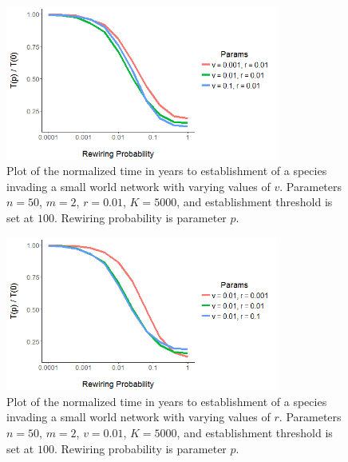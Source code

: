\documentclass[12pt, openany]{book}
\theoremstyle{definition}
\theoremstyle{remark}
\numberwithin{equation}{chapter}
\numberwithin{figure}{chapter}
\begin{document}
\begin{figure}[t!]
\begin{center}
       \includegraphics[width=0.8\textwidth]{smallworldvaryv_norm.png}
       \caption{Plot of the normalized time in years to establishment of a species invading a small world network with varying values of $v$. Parameters $n = 50$, $m = 2$, $r = 0.01$, $K = 5000$, and establishment threshold is set at $100$. Rewiring probability is parameter $p$.\label{smallworld_v}}
\end{center}
\end{figure}
\begin{figure}[t!]
\begin{center}
       \includegraphics[width=0.8\textwidth]{smallworldvaryb_norm.png}
       \caption{Plot of the normalized time in years to establishment of a species invading a small world network with varying values of $r$. Parameters $n = 50$, $m = 2$, $v = 0.01$, $K = 5000$, and establishment threshold is set at $100$. Rewiring probability is parameter $p$.\label{smallworld_b}}
\end{center}
\end{figure}
\end{document}
